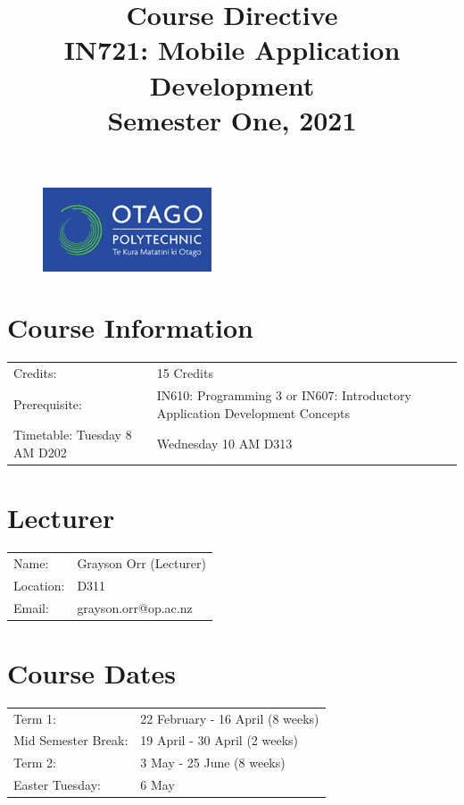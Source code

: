 \documentclass{article}
\author{}
\begin{document}
\begin{figure}
	\includegraphics[width=50mm]{./img/logo.png}
\end{figure}

\title{Course Directive\\IN721: Mobile Application Development\\Semester One, 2021}
\date{}
\maketitle

\section*{Course Information}
\begin{tabular}{ll}
	Credits:                      & 15 Credits                                                                   \\
	Prerequisite:                 & IN610: Programming 3 or IN607: Introductory Application Development Concepts \\
	Timetable:  Tuesday 8 AM D202 & Wednesday 10 AM D313                                                         \\
\end{tabular}

\section*{Lecturer}
\begin{tabular}{ll}
	Name:     & Grayson Orr (Lecturer) \\
	Location: & D311                   \\
	Email:    & grayson.orr@op.ac.nz   \\
\end{tabular}

\section*{Course Dates}
\begin{tabular}{ll}
	Term 1:             & 22 February - 16 April (8 weeks) \\
	Mid Semester Break: & 19 April - 30 April (2 weeks)    \\
	Term 2:             & 3 May - 25 June (8 weeks)        \\     
	Easter Tuesday:     & 6 May                            \\                 
\end{tabular}
\end{document}
